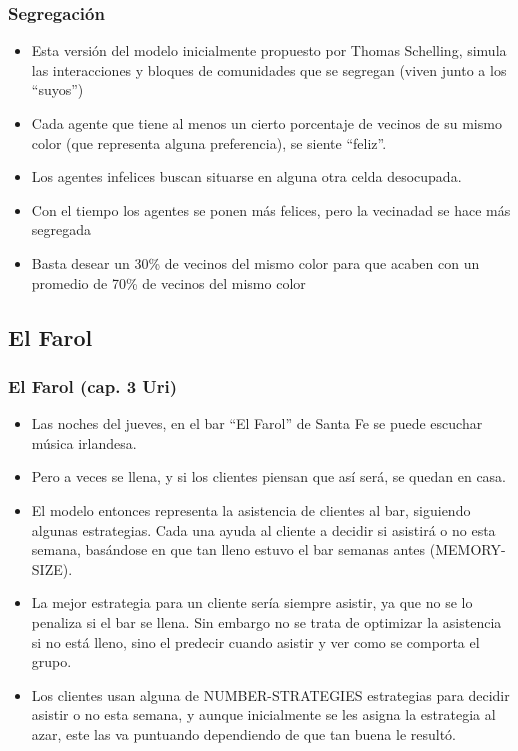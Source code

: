 \documentclass{beamer}
\begin{document}
\begin{frame}[t]
\frametitle{Segregación}
\begin{itemize}[<+-| alert@+>]
	\item Esta versión del modelo inicialmente propuesto por Thomas Schelling, simula las interacciones y bloques de comunidades que se segregan (viven junto a los ``suyos'')
	\item Cada agente que tiene al menos un cierto porcentaje de vecinos de su mismo color (que representa alguna preferencia), se siente ``feliz''.
	\item Los agentes infelices buscan situarse en alguna otra celda desocupada.
	\item Con el tiempo los agentes se ponen más felices, pero la vecinadad se hace más segregada
	\item Basta desear un 30\% de vecinos del mismo color para que acaben con un promedio de 70\% de vecinos del mismo color
\end{itemize}

\end{frame}


\subsection{El Farol}
\begin{frame}[t]
\frametitle{El Farol (cap. 3 Uri)}
\begin{itemize}[<+-| alert@+>]
	\item Las noches del jueves, en el bar ``El Farol'' de Santa Fe se puede escuchar música irlandesa.
	\item Pero a veces se llena, y si los clientes piensan que así será, se quedan en casa.
	\item El modelo entonces representa la asistencia de clientes al bar, siguiendo algunas estrategias. Cada una ayuda al cliente a decidir si asistirá o no esta semana, basándose en que tan lleno estuvo el bar semanas antes (MEMORY-SIZE).
	\item La mejor estrategia para un cliente sería siempre asistir, ya que no se lo penaliza si el bar se llena. Sin embargo no se trata de optimizar la asistencia si no está lleno, sino el predecir cuando asistir y ver como se comporta el grupo.
	\item Los clientes usan alguna de NUMBER-STRATEGIES estrategias para decidir asistir o no esta semana, y aunque inicialmente se les asigna la estrategia al azar, este las va puntuando dependiendo de que tan buena le resultó.
\end{itemize}

\end{frame}
\end{document}
